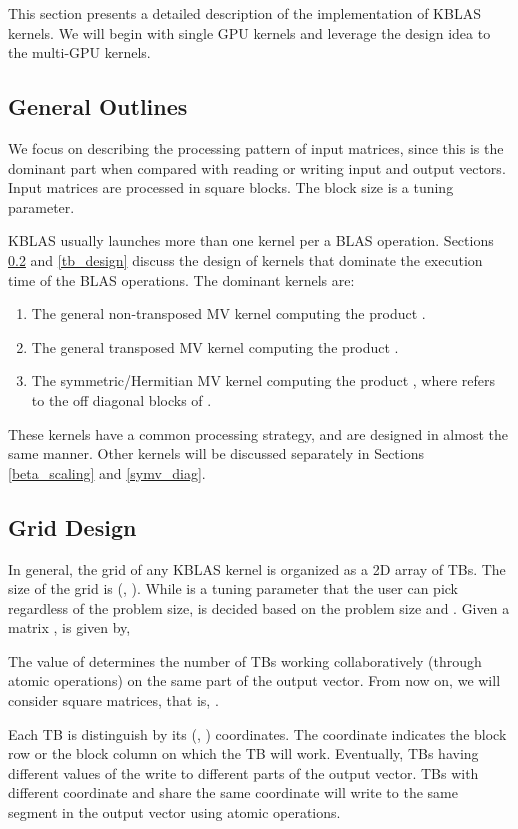This section presents a detailed description of the implementation of KBLAS kernels. 
We will begin with single GPU kernels 
and leverage the design idea to the multi-GPU kernels. 
\subsection{General Outlines}
\label{subsec:outlines}
We focus on describing the processing 
pattern of input matrices, since this is the dominant part when 
compared with reading or writing input and output vectors. 
Input matrices are processed in square blocks. The block size  is a tuning parameter. 

KBLAS usually launches more than one kernel per a BLAS operation. Sections \ref{grid_design} and \ref{tb_design} discuss 
the design of kernels that dominate the execution time of the BLAS operations. The dominant 
kernels are:
\begin{enumerate}
\item The general non-transposed MV kernel computing the product .
\item The general transposed MV kernel computing the product .
\item The symmetric/Hermitian MV kernel computing the product , where  
refers to the off diagonal blocks of . 
\end{enumerate}
These kernels 
have a common processing strategy, and are designed in almost the same manner. Other kernels will be 
discussed separately in Sections \ref{beta_scaling} and \ref{symv_diag}.
\subsection{Grid Design}
\label{grid_design}
In general, the grid of any KBLAS kernel is organized as a 2D array of TBs. 
The size of the grid is (, ). While  is a tuning parameter that 
the user can pick regardless of the problem size,  is decided based on the problem size and . Given a 
matrix ,  is given by, 

The value of  determines the number of TBs working collaboratively (through atomic operations) on the same 
part of the output vector. From now on, we will consider square matrices, that is, . 

Each TB is distinguish by its (, ) coordinates. The  coordinate indicates the 
block row or the block column on which the TB will work. Eventually, 
TBs having different values of the 
 write to different parts of the output vector. TBs with different  coordinate 
and share the same  coordinate will write to the same segment in the output vector using atomic operations. 


